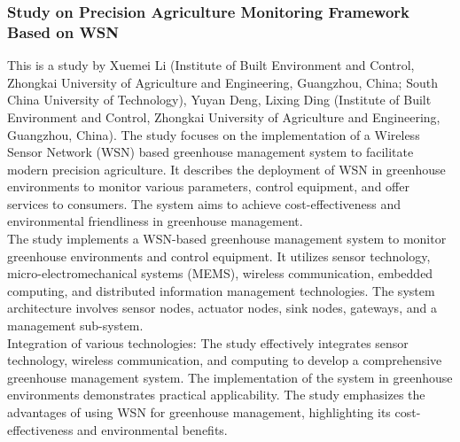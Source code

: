 \documentclass[12pt, a4paper]{article}
\begin{document}
\subsubsection{Study on Precision Agriculture Monitoring Framework Based on WSN}
This is a study by Xuemei Li (Institute of Built Environment and Control, Zhongkai University of Agriculture and Engineering, Guangzhou, China; South China University of Technology), Yuyan Deng, Lixing Ding (Institute of Built Environment and Control, Zhongkai University of Agriculture and Engineering, Guangzhou, China)\cite{li2008study}.
The study focuses on the implementation of a Wireless Sensor Network (WSN) based greenhouse management system to facilitate modern precision agriculture. It describes the deployment of WSN in greenhouse environments to monitor various parameters, control equipment, and offer services to consumers. The system aims to achieve cost-effectiveness and environmental friendliness in greenhouse management.\\
The study implements a WSN-based greenhouse management system to monitor greenhouse environments and control equipment. It utilizes sensor technology, micro-electromechanical systems (MEMS), wireless communication, embedded computing, and distributed information management technologies. The system architecture involves sensor nodes, actuator nodes, sink nodes, gateways, and a management sub-system.\\
 Integration of various technologies: The study effectively integrates sensor technology, wireless communication, and computing to develop a comprehensive greenhouse management system.
The implementation of the system in greenhouse environments demonstrates practical applicability. The study emphasizes the advantages of using WSN for greenhouse management, highlighting its cost-effectiveness and environmental benefits.
\end{document}
